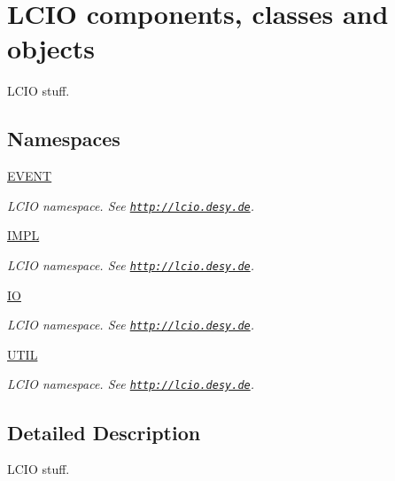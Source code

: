 \hypertarget{group___l_c_i_o}{}\section{L\+C\+IO components, classes and objects}
\label{group___l_c_i_o}


L\+C\+IO stuff.  


\subsection*{Namespaces}
\begin{DoxyCompactItemize}
\item 
 \hyperlink{namespace_e_v_e_n_t}{E\+V\+E\+NT}
\begin{DoxyCompactList}\small\item\em L\+C\+IO namespace. See \href{http://lcio.desy.de}{\tt http\+://lcio.\+desy.\+de}. \end{DoxyCompactList}\item 
 \hyperlink{namespace_i_m_p_l}{I\+M\+PL}
\begin{DoxyCompactList}\small\item\em L\+C\+IO namespace. See \href{http://lcio.desy.de}{\tt http\+://lcio.\+desy.\+de}. \end{DoxyCompactList}\item 
 \hyperlink{namespace_i_o}{IO}
\begin{DoxyCompactList}\small\item\em L\+C\+IO namespace. See \href{http://lcio.desy.de}{\tt http\+://lcio.\+desy.\+de}. \end{DoxyCompactList}\item 
 \hyperlink{namespace_u_t_i_l}{U\+T\+IL}
\begin{DoxyCompactList}\small\item\em L\+C\+IO namespace. See \href{http://lcio.desy.de}{\tt http\+://lcio.\+desy.\+de}. \end{DoxyCompactList}\end{DoxyCompactItemize}


\subsection{Detailed Description}
L\+C\+IO stuff. 

